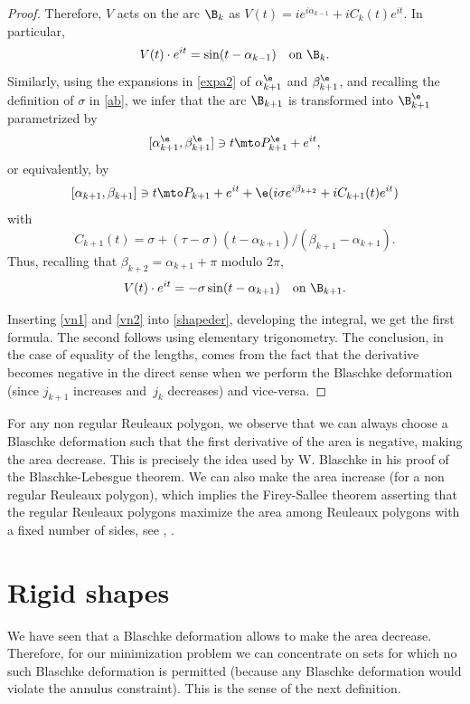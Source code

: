 \begin{proof}
Therefore, $V$ acts on the arc $\B_k$ as $V(t)= i e^{i\alpha_{k-1}} + i C_k(t)e^{it}$. In particular,
\begin{equation}\label{vn1}
V(t)\cdot e^{it} = \sin(t-\alpha_{k-1}) \quad \hbox{on }\B_{k}.
\end{equation}
Similarly, using the expansions in \eqref{expa2} of $\alpha_{k+1}^\e$ and $\beta_{k+1}^\e$, and recalling the definition of $\sigma$ in \eqref{ab}, we infer that the arc $\B_{k+1}$ is transformed into $\B_{k+1}^\e$ {parametrized by}
\[
[\alpha_{k+1}^\e,\beta_{k+1}^\e] \ni t \mto P_{k+1}^\e + e^{it},
\]
{or equivalently, by}
\[
[\alpha_{k+1},\beta_{k+1}] \ni t \mto P_ {k+1} + e^{it} + \e (i \sigma e^{i \beta_{k+2}} + i C_{k+1}(t)e^{it})
\]
with
\[
C_{k+1}(t)= \sigma + (\tau-\sigma)(t-\alpha_{k+1})/(\beta_{k+1}-\alpha_{k+1}).
\]
Thus, recalling that $\beta_{k+2}=\alpha_{k+1}+\pi$ modulo $2\pi$,
\begin{equation}\label{vn2}
V(t)\cdot e^{it} =-\sigma \sin (t-\alpha_{k+1})\quad \hbox{on }\B_{k+1}.
\end{equation}

Inserting \eqref{vn1} and \eqref{vn2} into \eqref{shapeder}, developing the integral, we get the first formula. The second follows using elementary trigonometry. The conclusion, in
the case of equality of the lengths, comes from the fact that the derivative becomes negative
in the direct sense when we perform the Blaschke deformation (since $j_{k+1}$ increases
and~$j_k$ decreases) and vice-versa.
\end{proof}

\begin{remark} For any non regular Reuleaux polygon, we observe that
we can always choose a Blaschke deformation such that the first derivative of the area
is negative, making the area decrease. This is precisely
the idea used by W. Blaschke in his proof of the Blaschke-Lebesgue theorem. We can also
make the area increase (for a non regular Reuleaux polygon), which implies the Firey-Sallee
theorem asserting that the regular Reuleaux polygons maximize the area among Reuleaux polygons
with a fixed number of sides, see \cite{CG}, \cite{KM}.
\end{remark}

\section{Rigid shapes}\label{sec-rs}
We have seen that a Blaschke deformation allows to make the area decrease. Therefore,
for our minimization problem we can concentrate on sets for which no such Blaschke
deformation is
permitted (because any Blaschke deformation would violate the annulus constraint). This is the sense of the next definition.

